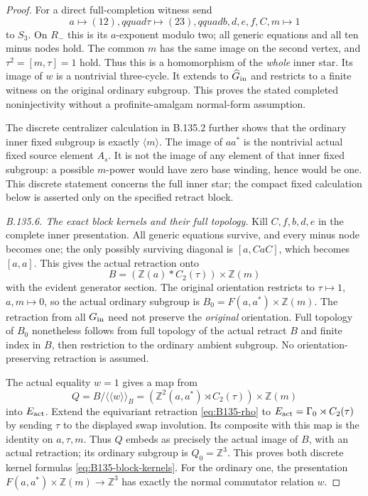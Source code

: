\begin{proof}
For a direct full-completion witness send
\[
 a\longmapsto(12),qquad\tau\longmapsto(23),qquad
 b,d,e,f,C,m\longmapsto1
\]
to $S_3$. On $R_-$ this is its $a$-exponent modulo two;
all generic equations and all ten minus nodes hold. The
common $m$ has the same image on the second vertex, and
$\tau^2=[m,\tau]=1$ hold. Thus this is a homomorphism of
the \emph{whole} inner star. Its image of $w$ is a nontrivial
three-cycle. It extends to $\widehat G_{\rm in}$ and restricts
to a finite witness on the original ordinary subgroup.
This proves the stated completed noninjectivity without a
profinite-amalgam normal-form assumption.

The discrete centralizer calculation in B.135.2 further shows
that the ordinary inner fixed subgroup is exactly $\langle m\rangle$.
The image of $aa^*$ is the nontrivial actual fixed source
element $A_s$. It is not the image of any element of that
inner fixed subgroup: a possible $m$-power would have zero
base winding, hence would be one. This discrete statement
concerns the full inner star; the compact fixed calculation
below is asserted only on the specified retract block.

\emph{B.135.6. The exact block kernels and their full topology.}
Kill $C,f,b,d,e$ in the complete inner presentation. All
generic equations survive, and every minus node becomes one;
the only possibly surviving diagonal is $[a,CaC]$, which
becomes $[a,a]$. This gives the actual retraction onto
\[
 B=(\mathbb Z(a)*C_2(\tau))\times\mathbb Z(m)
\]
with the evident generator section. The original orientation
restricts to $\tau\mapsto1$, $a,m\mapsto0$, so the actual
ordinary subgroup is $B_0=F(a,a^*)\times\mathbb Z(m)$.
The retraction from all $G_{\rm in}$ need not preserve the
\emph{original} orientation. Full topology of $B_0$ nonetheless
follows from full topology of the actual retract $B$ and
finite index in $B$, then restriction to the ordinary ambient
subgroup. No orientation-preserving retraction is assumed.

The actual equality $w=1$ gives a map from
\[
 Q=B/\langle\!\langle w\rangle\!\rangle_B
   =(\mathbb Z^2(a,a^*)\rtimes C_2(\tau))\times\mathbb Z(m)
\]
into $E_{\rm act}$. Extend the equivariant retraction
\eqref{eq:B135-rho} to $E_{\rm act}=\Gamma_0\rtimes C_2(\tau)$
by sending $\tau$ to the displayed swap involution. Its
composite with this map is the identity on $a,\tau,m$.
Thus $Q$ embeds as precisely the actual image of $B$, with
an actual retraction; its ordinary subgroup is $Q_0=\mathbb Z^3$.
This proves both discrete kernel formulas
\eqref{eq:B135-block-kernels}. For the ordinary one, the
presentation $F(a,a^*)\times\mathbb Z(m)\to\mathbb Z^3$
has exactly the normal commutator relation $w$.


\end{proof}
